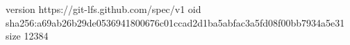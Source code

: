 version https://git-lfs.github.com/spec/v1
oid sha256:a69ab26b29de0536941800676c01ccad2d1ba5abfac3a5fd08f00bb7934a5e31
size 12384
